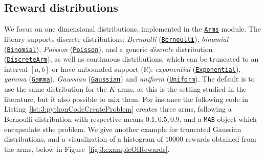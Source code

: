 \subsection{Reward distributions}
%
We focus on one dimensional distributions, implemented in the \texttt{\href{https://smpybandits.github.io/docs/Arms.html}{Arms}} module.
The library supports discrete distributions: \emph{Bernoulli} (\texttt{\href{https://smpybandits.github.io/docs/Arms.Bernoulli.html}{Bernoulli}}), \emph{binomial} (\texttt{\href{https://smpybandits.github.io/docs/Arms.Binomial.html}{Binomial}}), \emph{Poisson} (\texttt{\href{https://smpybandits.github.io/docs/Arms.Poisson.html}{Poisson}}), and a generic \emph{discrete} distribution (\texttt{\href{https://smpybandits.github.io/docs/Arms.DiscreteArm.html}{DiscreteArm}}),
as well as continuous distributions,
which can be truncated to an interval $[a,b]$ or have unbounded support ($\mathbb{R}$):
\emph{exponential} (\texttt{\href{https://smpybandits.github.io/docs/Arms.Exponential.html}{Exponential}}), \emph{gamma} (\texttt{\href{https://smpybandits.github.io/docs/Arms.Gamma.html}{Gamma}}), \emph{Gaussian} (\texttt{\href{https://smpybandits.github.io/docs/Arms.Gaussian.html}{Gaussian}}) and \emph{uniform} (\texttt{\href{https://smpybandits.github.io/docs/Arms.Uniform.html}{Uniform}}).
%
The default is to use the same distribution for the $K$ arms, as this is the setting studied in the literature,
but it also possible to mix them.
%
For instance the following code in Listing~\ref{lst:3:pythonCodeCreateProblem} creates three arms, following a Bernoulli distribution with respective means $0.1, 0.5, 0.9$, and a \texttt{MAB} object which encapsulate sthe problem.
We give another example for truncated Gaussian distributions, and a visualization of a histogram of $10000$ rewards obtained from the arms, below in Figure~\ref{fig:3:exampleOfRewards}.

